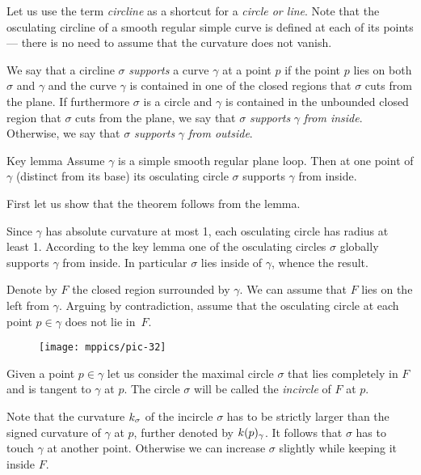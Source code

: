 \documentclass{article}
\begin{document}
Let us use the term \emph{circline} as a shortcut for a \emph{circle or line}.
Note that the osculating circline of a smooth regular simple curve is defined at each of its points --- there is no need to assume that the curvature does not vanish.

We say that a circline $\sigma$ \emph{supports} a curve $\gamma$ at a point $p$ if the point $p$ lies on both $\sigma$ and $\gamma$ and the curve $\gamma$ is contained in one of the closed regions that $\sigma$ cuts from the plane. If furthermore $\sigma$ is a circle and $\gamma$ is contained in the unbounded closed region that $\sigma$ cuts from the plane, we say that $\sigma$ \emph{supports} $\gamma$ \emph{from inside}. Otherwise, we say that $\sigma$ \emph{supports} $\gamma$ \emph{from outside}.



\begin{thm}{Key lemma}\label{thm:moon}
Assume $\gamma$ is a simple smooth regular plane loop.
Then at one point of $\gamma$ (distinct from its base) its osculating circle $\sigma$ %
 supports $\gamma$ from inside.
\end{thm}

First let us show that the theorem follows from the lemma.

Since $\gamma$ has absolute curvature at most 1, each osculating circle has radius at least 1.
According to the key lemma one of the osculating circles $\sigma$ globally supports $\gamma$ from inside.
In particular $\sigma$ lies inside of $\gamma$, whence the result.
\qeds

Denote by $F$ the closed region surrounded by $\gamma$.
We can assume that $F$ lies on the left from $\gamma$.
Arguing by contradiction,
assume that the osculating circle at each point $p\in \gamma$ does not lie in~$F$.

\begin{figure}[!ht]%
\vskip-0mm
\centering
\texttt{[image: mppics/pic-32]}
\vskip0mm
\end{figure}

Given a point $p\in\gamma$ let us consider the maximal circle $\sigma$ that lies completely in $F$ and is tangent to $\gamma$ at $p$.
The circle $\sigma$ will be called the {}\emph{incircle} of $F$ at $p$.

Note that the curvature $k_\sigma$ of the incircle $\sigma$ has to be strictly larger than the signed curvature of $\gamma$ at $p$, further denoted by $k(p)_\gamma$.
It follows that $\sigma$ has to touch $\gamma$ at another point.
Otherwise we can increase $\sigma$ slightly while keeping it inside $F$.
\end{document}
